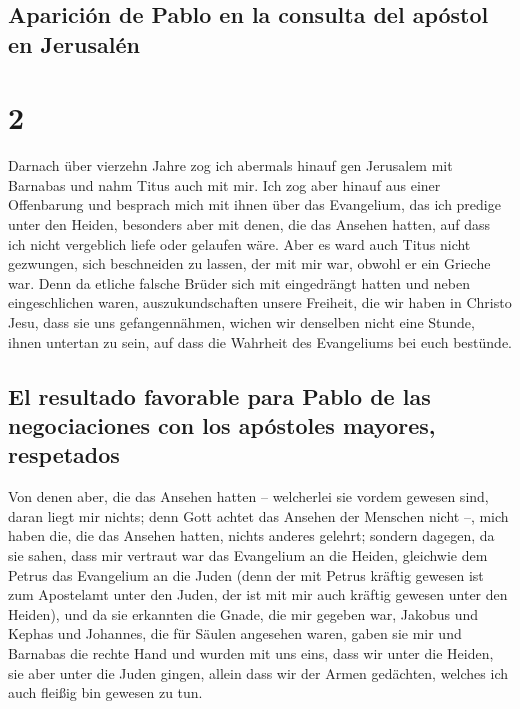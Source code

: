 \hypertarget{apariciuxf3n-de-pablo-en-la-consulta-del-apuxf3stol-en-jerusaluxe9n}{%
\subsection{Aparición de Pablo en la consulta del apóstol en
Jerusalén}\label{apariciuxf3n-de-pablo-en-la-consulta-del-apuxf3stol-en-jerusaluxe9n}}

\hypertarget{section-1}{%
\section{2}\label{section-1}}

 Darnach über vierzehn Jahre zog ich abermals hinauf gen
Jerusalem mit Barnabas und nahm Titus auch mit mir.  Ich
zog aber hinauf aus einer Offenbarung und besprach mich mit ihnen über
das Evangelium, das ich predige unter den Heiden, besonders aber mit
denen, die das Ansehen hatten, auf dass ich nicht vergeblich liefe oder
gelaufen wäre.  Aber es ward auch Titus nicht gezwungen,
sich beschneiden zu lassen, der mit mir war, obwohl er ein Grieche war.
 Denn da etliche falsche Brüder sich mit eingedrängt
hatten und neben eingeschlichen waren, auszukundschaften unsere
Freiheit, die wir haben in Christo Jesu, dass sie uns gefangennähmen,
 wichen wir denselben nicht eine Stunde, ihnen untertan zu
sein, auf dass die Wahrheit des Evangeliums bei euch bestünde.

\hypertarget{el-resultado-favorable-para-pablo-de-las-negociaciones-con-los-apuxf3stoles-mayores-respetados}{%
\subsection{El resultado favorable para Pablo de las negociaciones con
los apóstoles mayores,
respetados}\label{el-resultado-favorable-para-pablo-de-las-negociaciones-con-los-apuxf3stoles-mayores-respetados}}

 Von denen aber, die das Ansehen hatten -- welcherlei sie
vordem gewesen sind, daran liegt mir nichts; denn Gott achtet das
Ansehen der Menschen nicht --, mich haben die, die das Ansehen hatten,
nichts anderes gelehrt;  sondern dagegen, da sie sahen,
dass mir vertraut war das Evangelium an die Heiden, gleichwie dem Petrus
das Evangelium an die Juden  (denn der mit Petrus kräftig
gewesen ist zum Apostelamt unter den Juden, der ist mit mir auch kräftig
gewesen unter den Heiden),  und da sie erkannten die
Gnade, die mir gegeben war, Jakobus und Kephas und Johannes, die für
Säulen angesehen waren, gaben sie mir und Barnabas die rechte Hand und
wurden mit uns eins, dass wir unter die Heiden, sie aber unter die Juden
gingen,  allein dass wir der Armen gedächten, welches ich
auch fleißig bin gewesen zu tun.

